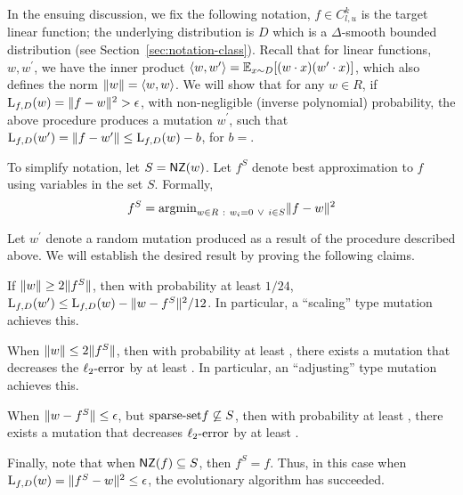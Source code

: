 In the ensuing discussion, we fix the following notation, $f \in C^k_{l, u}$ is
the target linear function; the underlying distribution is $D$ which is a
$\Delta$-smooth bounded distribution (see Section~\ref{sec:notation-class}). Recall
that for linear functions, $w, w^\prime$, we have the inner product
$\langle w, w^\prime \rangle = \mathbb{E}_{x \sim D}[(w \cdot x) (w^\prime \cdot x)]$, which also
defines the norm $\Vert w \Vert = \langle w, w \rangle$.  We will show that for any $w \in
R$, if $\mathrm{L}_{f, D}(w) = \Vert f - w \Vert^2 > \epsilon$, with non-negligible
(inverse polynomial) probability, the above procedure produces a mutation
$w^\prime$, such that $\mathrm{L}_{f, D}(w^\prime) = \Vert f - w^\prime \Vert \leq
\mathrm{L}_{f, D}(w) - b$, for $b = $. 

To simplify notation, let $S = \mathsf{NZ}(w)$. Let $f^S$ denote best approximation to
$f$ using variables in the set $S$. Formally, 
\[ 
f^S = \mathrm{argmin}_{w \in R ~:~	w_i = 0 ~\vee~ i \in S} \Vert f- w \Vert^2 
\]

Let $w^\prime$ denote a random mutation produced as a result of the procedure
described above.  We will establish the desired result by proving the following
claims.
\begin{claim} \label{claim:apple} If $\Vert w \Vert \geq 2 \Vert f^S \Vert$, then
with probability at least $1/24$, $\mathrm{L}_{f, D}(w^\prime) \leq \mathrm{L}_{f, D}(w) -
\Vert w - f^S \Vert^2/12$. In particular, a ``scaling'' type mutation achieves
this. \end{claim}
\begin{claim} \label{claim:banana} When $\Vert w \Vert \leq 2 \Vert f^S \Vert$,
then with probability at least , 
there exists a mutation that decreases the $\mathrm{\ell_2\mbox{-}error}$ by at least . In particular, an ``adjusting'' type mutation achieves this. \end{claim}
\begin{claim} \label{claim:cantelope} When $\Vert w - f^S \Vert \leq \epsilon$, but
$\mathrm{sparse\mbox{-}set}{f} \not\subseteq S$, then with probability at least , there exists a mutation that decreases
$\mathrm{\ell_2\mbox{-}error}$ by at least . \end{claim}

Finally, note that when $\mathsf{NZ}(f) \subseteq S$, then $f^S = f$. Thus, in this case
when $\mathrm{L}_{f, D}(w) = \Vert f^S - w \Vert^2 \leq \epsilon$, the evolutionary
algorithm has succeeded. \medskip 

